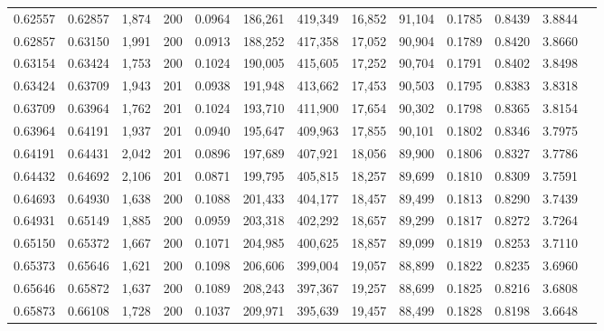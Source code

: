 \begin{tabular}{rrrrrrrrrrrrr}
0.62557 & 0.62857 & 1,874 & 200 &                                     0.0964 & 186,261 & 419,349 &  16,852 &  91,104 & 0.1785 & 0.8439 & 3.8844 \\
0.62857 & 0.63150 & 1,991 & 200 &                                     0.0913 & 188,252 & 417,358 &  17,052 &  90,904 & 0.1789 & 0.8420 & 3.8660 \\
0.63154 & 0.63424 & 1,753 & 200 &                                     0.1024 & 190,005 & 415,605 &  17,252 &  90,704 & 0.1791 & 0.8402 & 3.8498 \\
0.63424 & 0.63709 & 1,943 & 201 &                                     0.0938 & 191,948 & 413,662 &  17,453 &  90,503 & 0.1795 & 0.8383 & 3.8318 \\
0.63709 & 0.63964 & 1,762 & 201 &                                     0.1024 & 193,710 & 411,900 &  17,654 &  90,302 & 0.1798 & 0.8365 & 3.8154 \\
0.63964 & 0.64191 & 1,937 & 201 &                                     0.0940 & 195,647 & 409,963 &  17,855 &  90,101 & 0.1802 & 0.8346 & 3.7975 \\
0.64191 & 0.64431 & 2,042 & 201 &                                     0.0896 & 197,689 & 407,921 &  18,056 &  89,900 & 0.1806 & 0.8327 & 3.7786 \\
0.64432 & 0.64692 & 2,106 & 201 &                                     0.0871 & 199,795 & 405,815 &  18,257 &  89,699 & 0.1810 & 0.8309 & 3.7591 \\
0.64693 & 0.64930 & 1,638 & 200 &                                     0.1088 & 201,433 & 404,177 &  18,457 &  89,499 & 0.1813 & 0.8290 & 3.7439 \\
0.64931 & 0.65149 & 1,885 & 200 &                                     0.0959 & 203,318 & 402,292 &  18,657 &  89,299 & 0.1817 & 0.8272 & 3.7264 \\
0.65150 & 0.65372 & 1,667 & 200 &                                     0.1071 & 204,985 & 400,625 &  18,857 &  89,099 & 0.1819 & 0.8253 & 3.7110 \\
0.65373 & 0.65646 & 1,621 & 200 &                                     0.1098 & 206,606 & 399,004 &  19,057 &  88,899 & 0.1822 & 0.8235 & 3.6960 \\
0.65646 & 0.65872 & 1,637 & 200 &                                     0.1089 & 208,243 & 397,367 &  19,257 &  88,699 & 0.1825 & 0.8216 & 3.6808 \\
0.65873 & 0.66108 & 1,728 & 200 &                                     0.1037 & 209,971 & 395,639 &  19,457 &  88,499 & 0.1828 & 0.8198 & 3.6648 \\

\end{tabular}
